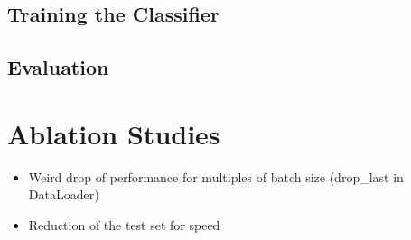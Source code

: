 \documentclass[]{article}
\begin{document}
\subsection{Training the Classifier}\label{sec:training_the_classifier}
\subsection{Evaluation}\label{sec:evaluation}


\section{Ablation Studies}
\begin{itemize}
	\item Weird drop of performance for multiples of batch size (drop\_last in DataLoader)
	\item Reduction of the test set for speed
\end{itemize}



 
\end{document}
